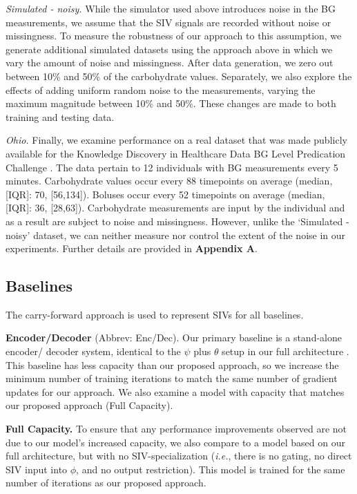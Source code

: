 \documentclass[letterpaper]{article}
\begin{document}
\textit{Simulated - noisy.} While the simulator used above introduces noise in the BG measurements, we assume that the SIV signals are recorded without noise or missingness. To measure the robustness of our approach to this assumption, we generate additional simulated datasets using the approach above in which we vary the amount of noise and missingness. After data generation, we zero out between 10\% and 50\% of the carbohydrate values. Separately, we also explore the effects of adding uniform random noise to the measurements, varying the maximum magnitude between 10\% and 50\%. These changes are made to both training and testing data.

\textit{Ohio.} Finally, we examine performance on a real dataset that was made publicly available for the Knowledge Discovery in Healthcare Data BG Level Predication Challenge \cite{kn:oc}.
The data pertain to 12 individuals with BG measurements every 5 minutes. Carbohydrate values occur every 88 timepoints on average (median, [IQR]: 70, [56,134]). Boluses occur every 52 timepoints on average (median, [IQR]: 36, [28,63]). Carbohydrate measurements are input by the individual and as a result are subject to noise and missingness. However, unlike the `Simulated - noisy' dataset, we can neither measure nor control the extent of the noise in our experiments. Further details are provided in \textbf{Appendix A}.

 
    


\subsection{Baselines}

The carry-forward approach is used to represent SIVs for all baselines.

\textbf{Encoder/Decoder} (Abbrev: Enc/Dec). Our primary baseline is a stand-alone encoder/ decoder system, identical to the $\psi$ plus $\theta$ setup in our full architecture \cite{iankdd}. This baseline has less capacity than our proposed approach, so we increase the minimum number of training iterations to match the same number of gradient updates for our approach. We also examine a model with capacity that matches our proposed approach (Full Capacity).

\textbf{Full Capacity.} To ensure that any performance improvements observed are not due to our model's increased capacity, we also compare  to a model based on our full architecture, but with no SIV-specialization (\textit{i.e.}, there is no gating,  no direct SIV input into $\phi$, and no output restriction). This model is trained for the same number of iterations as our proposed approach.
\end{document}

